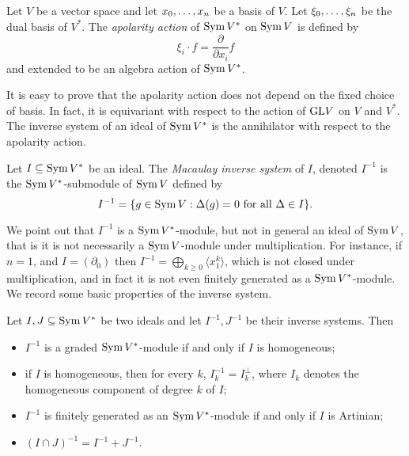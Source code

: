 \begin{definition}
\label{apolarity-definition-apolarityAction}
Let $V$ be a vector space and let $x_0 , \ldots , x_n$ be a basis of $V$. Let $\xi_0 , \ldots , \xi_n$ be the dual basis of $V^*$. The {\it apolarity action} of $\operatorname{Sym} V^*$ on $\operatorname{Sym} V$ is defined by 
\[
\xi_i \cdot f = \frac{\partial}{\partial x_i}f
\]
and extended to be an algebra action of $\operatorname{Sym} V^*$. 
\end{definition}
It is easy to prove that the apolarity action does not depend on the fixed choice of basis. In fact, it is equivariant with respect to the action of $\mathrm{GL} V$ on $V$ and $V^*$. The inverse system of an ideal of $\operatorname{Sym} V^*$ is the annihilator with respect to the apolarity action.
\begin{definition}
 \label{apolarity-definition-inverseSystem}
 Let $I \subseteq \operatorname{Sym} V^*$ be an ideal. The {\it Macaulay inverse system} of $I$, denoted $I^{-1}$ is the $\operatorname{Sym} V^*$-submodule of $\operatorname{Sym} V$ defined by 
 \[
 I^{-1} = \{ g \in \operatorname{Sym} V : \Delta (g) = 0 \text{ for all $\Delta \in I$}\}.
 \]
\end{definition}
We point out that $ I^{-1}$ is a $\operatorname{Sym} V^*$-module, but not in general an ideal of $\operatorname{Sym} V$, that is it is not necessarily a $\operatorname{Sym} V$-module under multiplication. For instance, if $n = 1$, and $I = (\partial_0)$ then $I^{-1} = \bigoplus_{k \geq 0} \langle x_1^k \rangle$, which is not closed under multiplication, and in fact it is not even finitely generated as a $\operatorname{Sym} V^*$-module. We record some basic properties of the inverse system.
\begin{proposition}
 \label{apolarity-proposition-inverseSystemBasics}
Let $I,J \subseteq \operatorname{Sym} V^*$ be two ideals and let $I^{-1}, J^{-1}$ be their inverse systems. Then 
\begin{itemize}
 \item $I^{-1}$ is a graded $\operatorname{Sym} V^*$-module if and only if $I$ is homogeneous;
 \item if $I$ is homogeneous, then for every $k$, $I^{-1}_k = I_k^\perp$, where $I_k$ denotes the homogeneous component of degree $k$ of $I$;
 \item $I^{-1}$ is finitely generated as an $\operatorname{Sym} V^*$-module if and only if $I$ is Artinian;
 \item $(I \cap J)^{-1} = I^{-1} + J^{-1}$.
\end{itemize}
\end{proposition}

